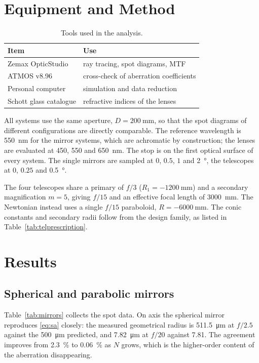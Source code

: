 \documentclass[conference]{IEEEtran}
\begin{document}
\section{Equipment and Method}
\label{sec:equip}

\begin{table}[htbp]
\caption{Tools used in the analysis.}
\label{tab:equip}
\centering
\small
\begin{tabular}{@{}ll@{}}
\toprule
\textbf{Item} & \textbf{Use} \\
\midrule
Zemax OpticStudio & ray tracing, spot diagrams, MTF \\
ATMOS v8.96 & cross-check of aberration coefficients \\
Personal computer & simulation and data reduction \\
Schott glass catalogue & refractive indices of the lenses \\
\bottomrule
\end{tabular}
\end{table}

All systems use the same aperture, $D = \SI{200}{\milli\meter}$, so that the
spot diagrams of different configurations are directly comparable. The
reference wavelength is \SI{550}{\nano\meter} for the mirror systems, which
are achromatic by construction; the lenses are evaluated at 450, 550 and
\SI{650}{\nano\meter}. The stop is on the first optical surface of every
system. The single mirrors are sampled at $0$, $0.5$, $1$ and
\SI{2}{\degree}, the telescopes at $0$, $0.25$ and \SI{0.5}{\degree}.

The four telescopes share a primary of $f/3$ ($R_1 = \SI{-1200}{\milli\meter}$)
and a secondary magnification $m = 5$, giving $f/15$ and an effective focal
length of \SI{3000}{\milli\meter}. The Newtonian instead uses a single
$f/15$ paraboloid, $R = \SI{-6000}{\milli\meter}$. The conic constants and
secondary radii follow from the design family, as listed in
Table~\ref{tab:telprescription}.

\section{Results}
\label{sec:res}

\subsection{Spherical and parabolic mirrors}
\label{sec:res-mirrors}

Table~\ref{tab:mirrors} collects the spot data. On axis the spherical mirror
reproduces \eqref{eq:sa} closely: the measured geometrical radius is
\SI{511.5}{\micro\meter} at $f/2.5$ against the \SI{500}{\micro\meter}
predicted, and \SI{7.82}{\micro\meter} at $f/20$ against \SI{7.81}{}. The
agreement improves from \SI{2.3}{\percent} to \SI{0.06}{\percent} as $N$
grows, which is the higher-order content of the aberration disappearing.
\end{document}
